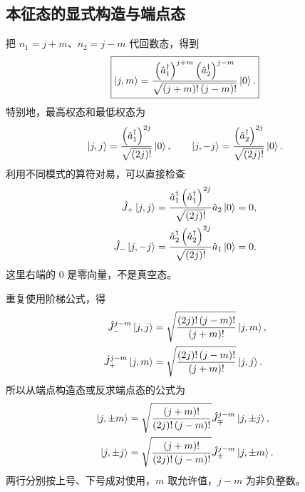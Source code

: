 \subsection{本征态的显式构造与端点态}
把 $n_1=j+m$、$n_2=j-m$ 代回数态，得到
\begin{equation}
\boxed{\Ket{j,m}=
\frac{\left(\hat a_1^\dag\right)^{j+m}\left(\hat a_2^\dag\right)^{j-m}}
{\sqrt{\left(j+m\right)!\left(j-m\right)!}}\Ket{0}.}
\label{eq:schwinger-state}
\end{equation}
特别地，最高权态和最低权态为
\begin{equation}
\Ket{j,j}=\frac{\left(\hat a_1^\dag\right)^{2j}}{\sqrt{\left(2j\right)!}}\Ket{0},\qquad
\Ket{j,-j}=\frac{\left(\hat a_2^\dag\right)^{2j}}{\sqrt{\left(2j\right)!}}\Ket{0}.
\end{equation}
利用不同模式的算符对易，可以直接检查
\begin{align}
\hat J_+\Ket{j,j}
&=\frac{\hat a_1^\dag\left(\hat a_1^\dag\right)^{2j}}{\sqrt{\left(2j\right)!}}\hat a_2\Ket{0}=0,\\
\hat J_-\Ket{j,-j}
&=\frac{\hat a_2^\dag\left(\hat a_2^\dag\right)^{2j}}{\sqrt{\left(2j\right)!}}\hat a_1\Ket{0}=0.
\end{align}
这里右端的 $0$ 是零向量，不是真空态。

重复使用阶梯公式，得
\begin{align}
\hat J_-^{j-m}\Ket{j,j}
&=\sqrt{\frac{\left(2j\right)!\left(j-m\right)!}{\left(j+m\right)!}}\Ket{j,m},\\
\hat J_+^{j-m}\Ket{j,m}
&=\sqrt{\frac{\left(2j\right)!\left(j-m\right)!}{\left(j+m\right)!}}\Ket{j,j}.
\end{align}
所以从端点构造态或反求端点态的公式为
\begin{align}
\Ket{j,\pm m}
&=\sqrt{\frac{\left(j+m\right)!}{\left(2j\right)!\left(j-m\right)!}}
\hat J_\mp^{j-m}\Ket{j,\pm j},\\
\Ket{j,\pm j}
&=\sqrt{\frac{\left(j+m\right)!}{\left(2j\right)!\left(j-m\right)!}}
\hat J_\pm^{j-m}\Ket{j,\pm m}.
\label{eq:angular-extremal-construction}
\end{align}
两行分别按上号、下号成对使用，$m$ 取允许值，$j-m$ 为非负整数。

